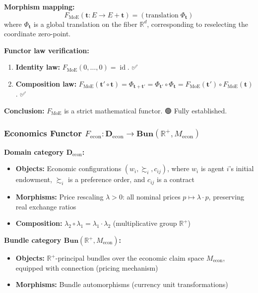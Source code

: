 \documentclass[12pt,a4paper]{article}
\theoremstyle{plain}
\theoremstyle{definition}
\newcommand{\R}{\mathbb{R}}
\DeclareMathOperator{\id}{id}
\begin{document}
\textbf{Morphism mapping:}
\begin{equation}
    F_{\text{MoE}}(\mathbf{t}: E \to E + \mathbf{t}) = (\text{translation}\; \Phi_{\mathbf{t}})
\end{equation}
where $\Phi_{\mathbf{t}}$ is a global translation on the fiber $\R^d$, corresponding to reselecting the coordinate zero-point.

\textbf{Functor law verification:}
\begin{enumerate}
    \item \textbf{Identity law:} $F_{\text{MoE}}(0,\ldots,0) = \id$. ✅
    \item \textbf{Composition law:} $F_{\text{MoE}}(\mathbf{t}' \circ \mathbf{t}) = \Phi_{\mathbf{t}+\mathbf{t}'} = \Phi_{\mathbf{t}'} \circ \Phi_{\mathbf{t}} = F_{\text{MoE}}(\mathbf{t}') \circ F_{\text{MoE}}(\mathbf{t})$. ✅
\end{enumerate}

\textbf{Conclusion:} $F_{\text{MoE}}$ is a strict mathematical functor. 🟢 Fully established.

\subsubsection{Economics Functor $F_{\text{econ}}: \mathbf{D}_{\text{econ}} \to \mathbf{Bun}(\R^+, M_{\text{econ}})$}

\textbf{Domain category $\mathbf{D}_{\text{econ}}$:}
\begin{itemize}
    \item \textbf{Objects:} Economic configurations $(w_i, \succsim_i, c_{ij})$, where $w_i$ is agent $i$'s initial endowment, $\succsim_i$ is a preference order, and $c_{ij}$ is a contract
    \item \textbf{Morphisms:} Price rescaling $\lambda > 0$: all nominal prices $p \mapsto \lambda \cdot p$, preserving real exchange ratios
    \item \textbf{Composition:} $\lambda_2 \circ \lambda_1 = \lambda_1 \cdot \lambda_2$ (multiplicative group $\R^+$)
\end{itemize}

\textbf{Bundle category $\mathbf{Bun}(\R^+, M_{\text{econ}})$:}
\begin{itemize}
    \item \textbf{Objects:} $\R^+$-principal bundles over the economic claim space $M_{\text{econ}}$, equipped with connection (pricing mechanism)
    \item \textbf{Morphisms:} Bundle automorphisms (currency unit transformations)
\end{itemize}
\end{document}
